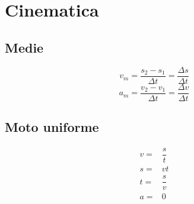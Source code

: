 \chapter{Cinematica}
\section{Medie}
\begin{equation}
v_m=\dfrac{s_2-s_1}{\Delta t}=\dfrac{\Delta s}{\Delta t}
\end{equation}
\begin{equation}
a_m=\dfrac{v_2-v_1}{\Delta t}=\dfrac{\Delta v}{\Delta t}
\end{equation}
\section{Moto uniforme}
\begin{align}
v=&\dfrac{s}{t}\\
s=&vt\\
t=&\dfrac{s}{v}\\
a=&0
\end{align}
